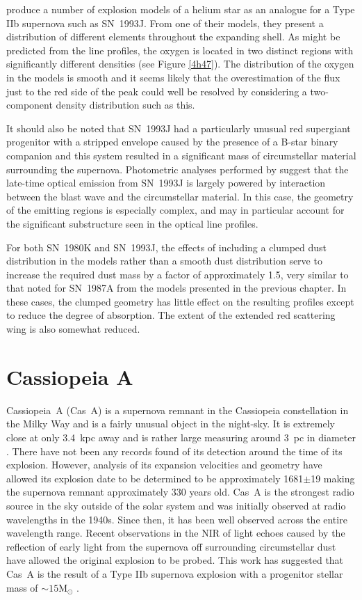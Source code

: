 \citet{Nomoto1993} produce a number of explosion models of a helium star as an analogue for a Type IIb supernova such as SN~1993J.  From one of their models, they present a distribution of different elements throughout the expanding shell.  As might be predicted from the line profiles, the oxygen is located in two distinct regions with significantly different densities (see Figure \ref{4h47}).   The distribution of the oxygen in the models is smooth and it seems likely that the overestimation of the flux just to the red side of the peak could well be resolved by considering a two-component density distribution such as this.

It should also be noted that SN~1993J had a particularly unusual red supergiant progenitor with a stripped envelope caused by the presence of a B-star binary companion \citep{Maund2004,Fox2014} and this system resulted in a significant mass of circumstellar material surrounding the supernova.  Photometric analyses performed by \citet{Zhang2004} suggest that the late-time optical emission from SN~1993J is largely powered by interaction between the blast wave and the circumstellar material.  In this case, the geometry of the emitting regions is especially complex, and may in particular account for the significant substructure seen in the optical line profiles.

For both SN~1980K and SN~1993J, the effects of including a clumped dust distribution in the models rather than a smooth dust distribution serve to increase the required dust mass by a factor of approximately 1.5, very similar to that noted for SN~1987A from the models presented in the previous chapter.  In these cases, the clumped geometry has little effect on the resulting profiles except to reduce the degree of absorption.  The extent of the extended red scattering wing is also somewhat reduced.


\section{Cassiopeia A}
\label{CasA_intro}

Cassiopeia~A (Cas~A) is a supernova remnant in the Cassiopeia constellation in the Milky Way and is a fairly unusual object in the night-sky.  It is extremely close at only 3.4~kpc away and  is rather large measuring around 3~pc in diameter \citep{Reed1995}.  There have not been any records found of its detection around the time of its explosion.  However, analysis of its expansion velocities and geometry have allowed its explosion date to be determined to be approximately 1681$\pm$19 \citep{Fesen2006} making the supernova remnant approximately 330 years old.  Cas~A is the strongest radio source in the sky outside of the solar system and was initially observed at radio wavelengths in the 1940s.  Since then, it has been well observed across the entire wavelength range.  Recent observations in the NIR of light echoes caused by the reflection of early light from the supernova off surrounding circumstellar dust have allowed the original explosion to be probed.  This work has suggested that Cas~A is the result of a Type IIb supernova explosion with a progenitor stellar mass of $\sim15$M$_{\odot}$ \citep{Krause2008}.

